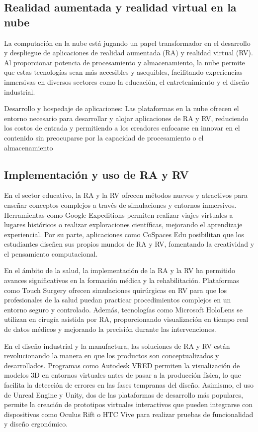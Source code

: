 {        \subsection{Realidad aumentada y realidad virtual en la nube}
            La computaci{\'o}n en la nube est{\'a} jugando un papel transformador en el desarrollo y despliegue de aplicaciones de realidad aumentada (RA) y realidad virtual (RV). Al proporcionar potencia de procesamiento y almacenamiento, la nube permite que estas tecnolog{\'i}as sean m{\'a}s accesibles y asequibles, facilitando experiencias inmersivas en diversos sectores como la educaci{\'o}n, el entretenimiento y el diseño industrial.
            
            Desarrollo y hospedaje de aplicaciones: Las plataformas en la nube ofrecen el entorno necesario para desarrollar y alojar aplicaciones de RA y RV, reduciendo los costos de entrada y permitiendo a los creadores enfocarse en innovar en el contenido sin preocuparse por la capacidad de procesamiento o el almacenamiento

        \subsection{Implementaci{\'o}n y uso de RA y RV}
            En el sector educativo, la RA y la RV ofrecen m{\'e}todos nuevos y atractivos para enseñar conceptos complejos a trav{\'e}s de simulaciones y entornos inmersivos. Herramientas como Google Expeditions permiten realizar viajes virtuales a lugares hist{\'o}ricos o realizar exploraciones cient{\'i}ficas, mejorando el aprendizaje experiencial. Por su parte, aplicaciones como CoSpaces Edu posibilitan que los estudiantes diseñen sus propios mundos de RA y RV, fomentando la creatividad y el pensamiento computacional.
            
            En el {\'a}mbito de la salud, la implementaci{\'o}n de la RA y la RV ha permitido avances significativos en la formaci{\'o}n m{\'e}dica y la rehabilitaci{\'o}n. Plataformas como Touch Surgery ofrecen simulaciones quir{\'u}rgicas en RV para que los profesionales de la salud puedan practicar procedimientos complejos en un entorno seguro y controlado. Adem{\'a}s, tecnolog{\'i}as como Microsoft HoloLens se utilizan en cirug{\'i}a asistida por RA, proporcionando visualizaci{\'o}n en tiempo real de datos m{\'e}dicos y mejorando la precisi{\'o}n durante las intervenciones.
            
            En el diseño industrial y la manufactura, las soluciones de RA y RV est{\'a}n revolucionando la manera en que los productos son conceptualizados y desarrollados. Programas como Autodesk VRED permiten la visualizaci{\'o}n de modelos 3D en entornos virtuales antes de pasar a la producci{\'o}n f{\'i}sica, lo que facilita la detecci{\'o}n de errores en las fases tempranas del diseño. Asimismo, el uso de Unreal Engine y Unity, dos de las plataformas de desarrollo m{\'a}s populares, permite la creaci{\'o}n de prototipos virtuales interactivos que pueden integrarse con dispositivos como Oculus Rift o HTC Vive para realizar pruebas de funcionalidad y diseño ergon{\'o}mico.
            
}
